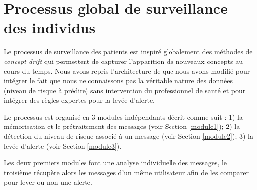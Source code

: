 \section{Processus global de surveillance des individus}\label{Methodes}


Le processus  de surveillance des patients est inspiré globalement des méthodes de \textit{concept drift} qui permettent de capturer l'apparition de nouveaux concepts au cours du temps. Nous avons repris l'architecture de \cite{Gama2014} que nous avons modifié pour intégrer le fait que nous ne connaissons pas la véritable nature des données (niveau de risque à prédire) sans intervention du professionnel de santé et pour intégrer des règles expertes pour la levée d'alerte. 

Le processus est organisé  en  $3$ modules indépendants décrit comme suit :
1) la mémorisation et le prétraitement des messages (voir Section \ref{module1});
2) la détection du niveau de risque associé à un message (voir Section \ref{module2});
3) la levée d'alerte (voir Section \ref{module3}).

Les deux premiers modules font une analyse individuelle des messages, le troisième récupère alors les messages d'un même utilisateur afin de les comparer pour lever ou non une alerte.



